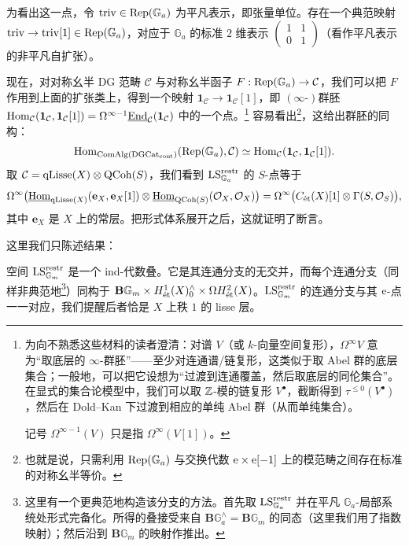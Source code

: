 为看出这一点，令 $\triv \in \Rep(\mathbb{G}_a)$ 为平凡表示，即张量单位。存在一个典范映射 $\triv \to \triv[1] \in \Rep(\mathbb{G}_a)$，对应于 $\mathbb{G}_a$ 的标准 $2$ 维表示 $\begin{pmatrix} 1 & 1 \\ 0 & 1 \end{pmatrix}$（看作平凡表示的非平凡自扩张）。

现在，对对称幺半 DG 范畴 $\mathcal{C}$ 与对称幺半函子 $F: \Rep(\mathbb{G}_a) \to \mathcal{C}$，我们可以把 $F$ 作用到上面的扩张类上，得到一个映射 $\mathbf{1}_{\mathcal{C}} \to \mathbf{1}_{\mathcal{C}}[1]$，即 $(\infty\text{-})\text{群胚}$ $\Hom_{\mathcal{C}}(\mathbf{1}_{\mathcal{C}}, \mathbf{1}_{\mathcal{C}}[1]) = \Omega^{\infty-1}\underline{\mathrm{End}}_{\mathcal{C}}(\mathbf{1}_{\mathcal{C}})$ 中的一个点。\footnote{为向不熟悉这些材料的读者澄清：对谱 $V$（或 $k$-向量空间复形），$\Omega^{\infty}V$ 意为“取底层的 $\infty$-群胚”——至少对连通谱/链复形，这类似于取 Abel 群的底层集合；一般地，可以把它设想为“过渡到连通覆盖，然后取底层的同伦集合”。在显式的集合论模型中，我们可以取 $\ZZ$-模的链复形 $V^\bullet$，截断得到 $\tau^{\leq 0}(V^\bullet)$，然后在 Dold--Kan 下过渡到相应的单纯 Abel 群（从而单纯集合）。

记号 $\Omega^{\infty-1}(V)$ 只是指 $\Omega^{\infty}(V[1])$。} 容易看出\footnote{也就是说，只需利用 $\Rep(\mathbb{G}_a)$ 与交换代数 $\e \times \e[-1]$ 上的模范畴之间存在标准的对称幺半等价。}，这给出群胚的同构：
\[
  \Hom_{\mathrm{ComAlg}(\DGCat_{\mathrm{cont}})}(\Rep(\mathbb{G}_a), \mathcal{C}) \simeq \Hom_{\mathcal{C}}(\mathbf{1}_{\mathcal{C}}, \mathbf{1}_{\mathcal{C}}[1]).
\]
取 $\mathcal{C} = \qLisse(X) \otimes \QCoh(S)$，我们看到 $\LS^{\restr}_{\mathbb{G}_a}$ 的 $S$-点等于
\[
  \Omega^{\infty}\bigl(\underline{\Hom}_{\qLisse(X)}(\mathbf{e}_X, \mathbf{e}_X[1]) \otimes \underline{\Hom}_{\QCoh(S)}(\OO_X, \OO_X)\bigr) = \Omega^{\infty}\bigl(C_{\et}(X)[1] \otimes \Gamma(S, \OO_S)\bigr),
\]
其中 $\mathbf{e}_X$ 是 $X$ 上的常层。把形式体系展开之后，这就证明了断言。

 这里我们只陈述结果：

空间 $\LS^{\restr}_{\mathbb{G}_m}$ 是一个 ind-代数叠。它是其连通分支的无交并，而每个连通分支（同样非典范地\footnote{这里有一个更典范地构造该分支的方法。首先取 $\LS^{\restr}_{\mathbb{G}_a}$ 并在平凡 $\mathbb{G}_a$-局部系统处形式完备化。所得的叠接受来自 $\mathbf{B}\mathbb{G}_a^{\wedge} = \mathbf{B}\mathbb{G}_m$ 的同态（这里我们用了指数映射）；然后沿到 $\mathbf{B}\mathbb{G}_m$ 的映射作推出。}）同构于 $\mathbf{B}\mathbb{G}_m \times H^1_{\et}(X)^{\wedge}_0 \times \Omega H^2_{\et}(X)$。$\LS^{\restr}_{\mathbb{G}_m}$ 的连通分支与其 $\e$-点一一对应，我们提醒后者恰是 $X$ 上秩 $1$ 的 lisse 层。

